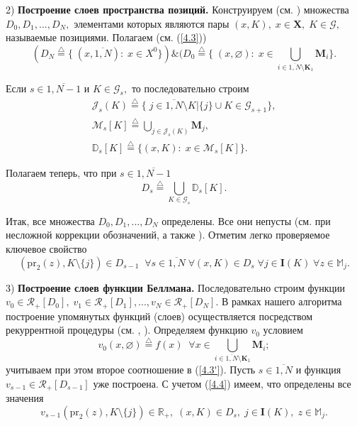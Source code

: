 \documentclass[10pt]{SPIIRAS_Proceedings}
\begin{document}
2) {\bf Построение слоев пространства позиций.}
Конструируем (см. \cite[$\S$4.9]{14})
множества $D_0,D_1,...,D_N,$
элементами которых являются пары
$(x,K),\;x \in \mathbf{X},\;K \in \mathcal{G},$
называемые позициями.
Полагаем (см. (\ref{4.3}))
\begin{equation}\label{4.3'}
  (D_N \stackrel{\triangle}{=} \{\;(x,\overline{1,N}):\;x \in X^0\}) \&
  (D_0 \stackrel{\triangle}{=} \{\;(x,\varnothing):\;x \in
    \bigcup\limits_{i \in \overline{1,N} \setminus \mathbf{K}_1} \mathbf{\mathbf{M}}_i\}.
\end{equation}

Если
$s \in \overline{1,N-1}$ и $K \in \mathcal{G}_s,$
то последовательно строим
\begin{multline*}
  \mathcal{J}_s(K) \stackrel{\triangle}{=}
  \{\;j \in \overline{1,N} \setminus K \vert \{j\} \cup K
  \in \mathcal{G}_{s+1}\},
  \\
  \mathcal{M}_s[K] \stackrel{\triangle}{=}
  \bigcup\limits_{j \in \mathcal{J}_s(K)} \mathbf{M}_j,
  \\
  \mathbb{D}_s[K] \stackrel{\triangle}{=}
  \{(x,K):\;x \in \mathcal{M}_s[K]\}.
\end{multline*}

Полагаем теперь, что при $s \in \overline{1,N - 1}$
$$
  D_s \stackrel{\triangle}{=} \bigcup\limits_{K \in \mathcal{G}_s} \mathbb{D}_s[K].
$$

Итак, все множества
$D_0,D_1,...,D_N$ определены.
Все они непусты
(см. \cite[предложение 4.9.3]{14}
при несложной коррекции обозначений,
а также \cite{21}).
Отметим легко проверяемое ключевое свойство
\begin{equation}\label{4.4}
  (\mathrm{pr}_2(z),K \setminus \{j\}) \in D_{s-1}\;\;
  \forall{s} \in \overline{1,N}\;\forall{(x,K)} \in D_s\;
  \forall{j} \in \mathbf{I}(K)\;\forall{z} \in \mathbb{M}_j.
\end{equation}

3) {\bf Построение слоев функции Беллмана.}
Последовательно строим функции
$v_0 \in \mathcal{R}_+[D_0],\;v_1 \in \mathcal{R}_+[D_1],...,v_N \in \mathcal{R}_+[D_N].$
В рамках нашего алгоритма построение упомянутых функций (слоев)
осуществляется посредством рекуррентной процедуры
(см. \cite[$\S$4.9]{14}, \cite{18,19,20,21}).
Определяем функцию $v_0$ условием
\begin{equation}\label{4.5}
  v_0(x,\varnothing) \stackrel{\triangle}{=} f(x)\;\;
  \forall{x} \in \bigcup\limits_{i \in \overline{1,N} \setminus \mathbf{K}_1} \mathbf{\mathbf{M}}_i;
\end{equation}
учитываем при этом второе соотношение в (\ref{4.3'}).
Пусть $s \in \overline{1,N}$
и функция
$v_{s-1} \in \mathcal{R}_+[D_{s-1}]$
уже построена.
С учетом (\ref{4.4}) имеем, что определены все значения
$$
  v_{s-1}(\mathrm{pr}_2(z),K \setminus \{j\}) \in \mathbb{R}_+,\;
  (x,K) \in D_s,\;j \in \mathbf{I}(K),\;z \in \mathbb{M}_j.
$$
\end{document}
